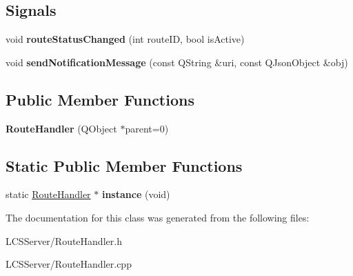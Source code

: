 \subsection*{Signals}
\begin{DoxyCompactItemize}
\item 
\mbox{\label{class_route_handler_a7a1c1d6c86a9eab1b92d28d610bc08c7}} 
void {\bfseries route\+Status\+Changed} (int route\+ID, bool is\+Active)
\item 
\mbox{\label{class_route_handler_ab90117cf6d0221640ec93dbf224a8e3a}} 
void {\bfseries send\+Notification\+Message} (const Q\+String \&uri, const Q\+Json\+Object \&obj)
\end{DoxyCompactItemize}
\subsection*{Public Member Functions}
\begin{DoxyCompactItemize}
\item 
\mbox{\label{class_route_handler_abb9fd855eb9fbbc794f8b3363dc3d408}} 
{\bfseries Route\+Handler} (Q\+Object $\ast$parent=0)
\end{DoxyCompactItemize}
\subsection*{Static Public Member Functions}
\begin{DoxyCompactItemize}
\item 
\mbox{\label{class_route_handler_a1ffbdae7e97aac32a6cbc125119d1668}} 
static \hyperlink{class_route_handler}{Route\+Handler} $\ast$ {\bfseries instance} (void)
\end{DoxyCompactItemize}


The documentation for this class was generated from the following files\+:\begin{DoxyCompactItemize}
\item 
L\+C\+S\+Server/Route\+Handler.\+h\item 
L\+C\+S\+Server/Route\+Handler.\+cpp\end{DoxyCompactItemize}
